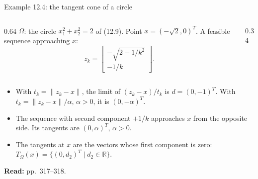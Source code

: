 \documentclass[aspectratio=169,12pt]{beamer}
\newcommand{\R}{\mathbb{R}}
\newcommand{\readbook}[1]{{\color{red}\textbf{Read:} #1}}
\newcommand{\TO}{T_{\Omega}}
\begin{document}
\begin{frame}{Example 12.4: the tangent cone of a circle}
  \begin{columns}[T,totalwidth=\textwidth]
    \begin{column}{0.64\textwidth}
      $\Omega$: the circle $x_{1}^{2}+x_{2}^{2}=2$ of (12.9). Point $x=(-\sqrt2,0)^{T}$.
      A feasible sequence approaching $x$:
      \[ z_{k}=\begin{bmatrix}-\sqrt{2-1/k^{2}}\\[0.1em] -1/k\end{bmatrix} . \tag{12.30} \]
    \end{column}
    \begin{column}{0.34\textwidth}
      \centering
    \end{column}
  \end{columns}
  \begin{itemize}\setlength\itemsep{0.4em}
    \item With $t_{k}=\|z_{k}-x\|$, the limit of $(z_{k}-x)/t_{k}$ is $d=(0,-1)^{T}$. With
      $t_{k}=\|z_{k}-x\|/\alpha$, $\alpha>0$, it is $(0,-\alpha)^{T}$.
    \item The sequence with second component $+1/k$ approaches $x$ from the opposite side.
      Its tangents are $(0,\alpha)^{T}$, $\alpha>0$.
    \item The tangents at $x$ are the vectors whose first component is zero:
      $\TO(x)=\{(0,d_{2})^{T}\mid d_{2}\in\R\}$.
  \end{itemize}
  \readbook{pp.~317--318.}
\end{frame}
\end{document}
